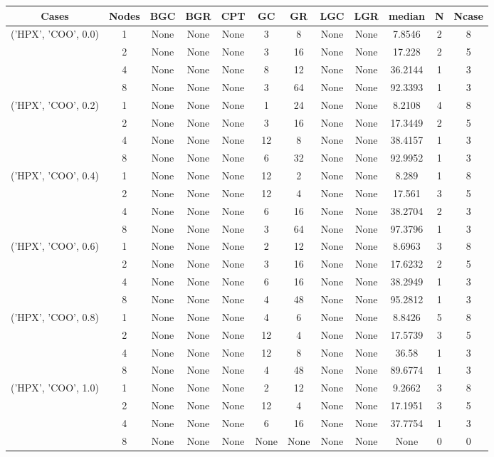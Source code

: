 \begin{tabular}{cccccccccccc}
\hline
Cases & Nodes& BGC& BGR& CPT& GC& GR& LGC& LGR& median & N & Ncase \\
\hline
\multirow{4}{*}{('HPX', 'COO', 0.0)}& 1& None& None& None& 3& 8& None& None& 7.8546& 2& 8\\
& 2& None& None& None& 3& 16& None& None& 17.228& 2& 5\\
& 4& None& None& None& 8& 12& None& None& 36.2144& 1& 3\\
& 8& None& None& None& 3& 64& None& None& 92.3393& 1& 3\\
\hline
\multirow{4}{*}{('HPX', 'COO', 0.2)}& 1& None& None& None& 1& 24& None& None& 8.2108& 4& 8\\
& 2& None& None& None& 3& 16& None& None& 17.3449& 2& 5\\
& 4& None& None& None& 12& 8& None& None& 38.4157& 1& 3\\
& 8& None& None& None& 6& 32& None& None& 92.9952& 1& 3\\
\hline
\multirow{4}{*}{('HPX', 'COO', 0.4)}& 1& None& None& None& 12& 2& None& None& 8.289& 1& 8\\
& 2& None& None& None& 12& 4& None& None& 17.561& 3& 5\\
& 4& None& None& None& 6& 16& None& None& 38.2704& 2& 3\\
& 8& None& None& None& 3& 64& None& None& 97.3796& 1& 3\\
\hline
\multirow{4}{*}{('HPX', 'COO', 0.6)}& 1& None& None& None& 2& 12& None& None& 8.6963& 3& 8\\
& 2& None& None& None& 3& 16& None& None& 17.6232& 2& 5\\
& 4& None& None& None& 6& 16& None& None& 38.2949& 1& 3\\
& 8& None& None& None& 4& 48& None& None& 95.2812& 1& 3\\
\hline
\multirow{4}{*}{('HPX', 'COO', 0.8)}& 1& None& None& None& 4& 6& None& None& 8.8426& 5& 8\\
& 2& None& None& None& 12& 4& None& None& 17.5739& 3& 5\\
& 4& None& None& None& 12& 8& None& None& 36.58& 1& 3\\
& 8& None& None& None& 4& 48& None& None& 89.6774& 1& 3\\
\hline
\multirow{4}{*}{('HPX', 'COO', 1.0)}& 1& None& None& None& 2& 12& None& None& 9.2662& 3& 8\\
& 2& None& None& None& 12& 4& None& None& 17.1951& 3& 5\\
& 4& None& None& None& 6& 16& None& None& 37.7754& 1& 3\\
& 8& None& None& None& None& None& None& None& None& 0& 0\\
\hline
\end{tabular}
